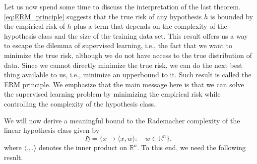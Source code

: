 \begin{rmk}
	Let us now spend some time to discuss the interpretation of the last theorem.
	\eqref{eq:ERM_principle} suggests that the true risk of any hypothesis $h$ is
	bounded by the empirical risk of $h$ plus a term that depends on the complexity
	of the hypothesis class and the size of the training data set. This result
	offers us a way to escape the dilemma of supervised learning, i.e., the fact
	that we want to minimize the true risk, although we do not have access to the
	true distribution of data. Since we cannot directly minimize the true risk, we
	can do the next best thing available to us, i.e., minimize an upperbound to it.
	Such result is called the ERM principle. We emphasize that the main message here
	is that we can solve the supervised learning problem by minimizing the empirical
	risk while controlling the complexity of the hypothesis class.		
\end{rmk}

We will now derive a meaningful bound to the Rademacher complexity of the
linear hypothesis class given by 
$$
\mathfrak{H} = \{x \to \langle x, w \rangle: \quad w \in  \mathbb{R}^n\},
$$
where $\langle., . \rangle$ denotes the inner product on $\mathbb{R}^n$. To this
end, we need the following result.

